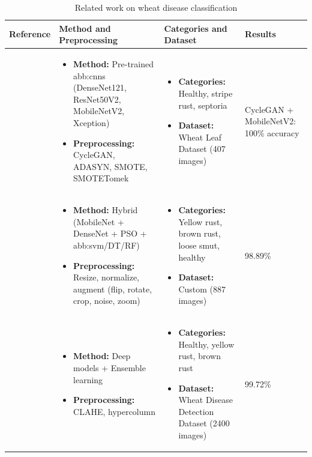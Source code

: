\begin{longtable}{|p{3cm}|p{6cm}|p{3.5cm}|p{2.5cm}|}
\caption{Related work on wheat disease classification} \label{tab:wheat-disease-related-work} \\
\hline
\textbf{Reference} & \textbf{Method and Preprocessing} & \textbf{Categories and Dataset} & \textbf{Results} \\
\hline
\endfirsthead
\endhead

\parencite{ramadan2024improving} & 
\begin{itemize}
    \item \textbf{Method:} Pre-trained \gls{abb:cnn}s (DenseNet121, ResNet50V2, MobileNetV2, Xception)
    \item \textbf{Preprocessing:} CycleGAN, ADASYN, SMOTE, SMOTETomek
\end{itemize} &
\begin{itemize}
    \item \textbf{Categories:} Healthy, stripe rust, septoria
    \item \textbf{Dataset:} Wheat Leaf Dataset (407 images)
\end{itemize} &
CycleGAN + MobileNetV2: 100\% accuracy \\
\hline

\parencite{nagpal2024hybrid} & 
\begin{itemize}
    \item \textbf{Method:} Hybrid (MobileNet + DenseNet + PSO + \gls{abb:svm}/DT/RF)
    \item \textbf{Preprocessing:} Resize, normalize, augment (flip, rotate, crop, noise, zoom)
\end{itemize} &
\begin{itemize}
    \item \textbf{Categories:} Yellow rust, brown rust, loose smut, healthy
    \item \textbf{Dataset:} Custom (887 images)
\end{itemize} &
98.89\% \\
\hline

\parencite{reis2024integrated} &
\begin{itemize}
    \item \textbf{Method:} Deep models + Ensemble learning
    \item \textbf{Preprocessing:} CLAHE, hypercolumn
\end{itemize} &
\begin{itemize}
    \item \textbf{Categories:} Healthy, yellow rust, brown rust
    \item \textbf{Dataset:} Wheat Disease Detection Dataset (2400 images)
\end{itemize} &
99.72\% \\
\hline


\end{longtable}
